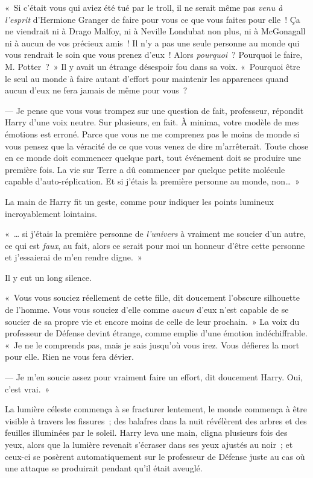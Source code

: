 «~Si c'était vous qui aviez été tué par le troll, il ne serait même pas \emph{venu à l'esprit} d'Hermione Granger de faire pour vous ce que vous faites pour elle~! Ça ne viendrait ni à Drago Malfoy, ni à Neville Londubat non plus, ni à McGonagall ni à aucun de vos précieux amis~! Il n'y a pas une seule personne au monde qui vous rendrait le soin que vous prenez d'eux~! Alors \emph{pourquoi}~? Pourquoi le faire, M. Potter~?~» Il y avait un étrange désespoir fou dans sa voix. «~Pourquoi être le seul au monde à faire autant d'effort pour maintenir les apparences quand aucun d'eux ne fera jamais de même pour vous~?

--- Je pense que vous vous trompez sur une question de fait, professeur, répondit Harry d'une voix neutre. Sur plusieurs, en fait. À minima, votre modèle de mes émotions est erroné. Parce que vous ne me comprenez pas le moins de monde si vous pensez que la véracité de ce que vous venez de dire m'arrêterait. Toute chose en ce monde doit commencer quelque part, tout événement doit se produire une première fois. La vie sur Terre a dû commencer par quelque petite molécule capable d'auto-réplication. Et si j'étais la première personne au monde, non…~»

La main de Harry fit un geste, comme pour indiquer les points lumineux incroyablement lointains.

«~… si j'étais la première personne de \emph{l'univers} à vraiment me soucier d'un autre, ce qui est \emph{faux}, au fait, alors ce serait pour moi un honneur d'être cette personne et j'essaierai de m'en rendre digne.~»

Il y eut un long silence.

«~Vous vous souciez réellement de cette fille, dit doucement l'obscure silhouette de l'homme. Vous vous souciez d'elle comme \emph{aucun} d'eux n'est capable de se soucier de sa propre vie et encore moins de celle de leur prochain.~» La voix du professeur de Défense devint étrange, comme emplie d'une émotion indéchiffrable. «~Je ne le comprends pas, mais je sais jusqu'où vous irez. Vous défierez la mort pour elle. Rien ne vous fera dévier.

--- Je m'en soucie assez pour vraiment faire un effort, dit doucement Harry. Oui, c'est vrai.~»

La lumière céleste commença à se fracturer lentement, le monde commença à être visible à travers les fissures~; des balafres dans la nuit révélèrent des arbres et des feuilles illuminées par le soleil. Harry leva une main, cligna plusieurs fois des yeux, alors que la lumière revenait s'écraser dans ses yeux ajustés au noir~; et ceux-ci se posèrent automatiquement sur le professeur de Défense juste au cas où une attaque se produirait pendant qu'il était aveuglé.

